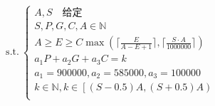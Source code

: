 \documentclass[preview]{standalone}
\begin{document}
\begin{align*}
\text{s.t.}~\begin{cases}A, S \quad \text{给定} \\S, P, G, C, A \in \mathbb{N} \\A \geq E \geq C \max(\lceil \frac{E}{A - E + 1} \rceil, \lceil \frac{S \cdot A}{1000000} \rceil) \\a_1 P + a_2 G + a_3 C = k \\a_1 = 900000, a_2 = 585000, a_3 = 100000 \\k \in \mathbb{N}, k \in \left[ (S - 0.5)A, (S + 0.5)A \right) \\\end{cases}
\end{align*}
\end{document}
